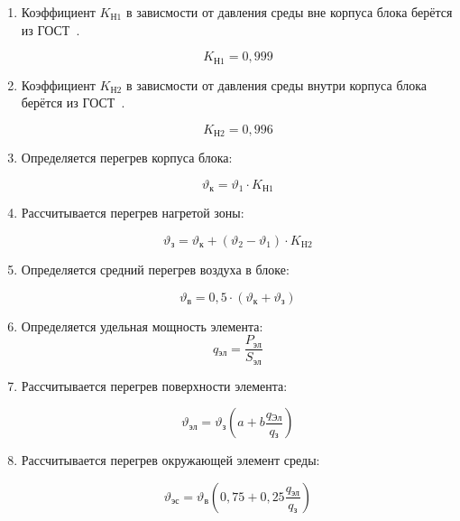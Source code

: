 \begin{enumerate}
\item Коэффициент $K\mathrm{_{Н1}}$ в зависмости от давления
  среды вне корпуса блока берётся из ГОСТ~\cite{GOST-15150-69}.

  $$K\mathrm{_{Н1}} = 0,999$$

  \item Коэффициент $K\mathrm{_{Н2}}$ в зависмости от давления
  среды внутри корпуса блока берётся из ГОСТ~\cite{GOST-15150-69}.

  $$K\mathrm{_{Н2}} = 0,996$$

\item Определяется перегрев корпуса блока:

  \begin{equation}
    \vartheta\mathrm{_к} = \vartheta_1 \cdot K\mathrm{_{Н1}}
  \end{equation}

\item Рассчитывается перегрев нагретой зоны:

  \begin{equation}
    \vartheta\mathrm{_з} = \vartheta\mathrm{_к} + (\vartheta_2 - \vartheta_1) \cdot K\mathrm{_{H2}}
  \end{equation}

\item Определяется средний перегрев воздуха в блоке:

  \begin{equation}
      \vartheta\mathrm{_в} = 0,5 \cdot (\vartheta\mathrm{_к} + \vartheta\mathrm{_з})
    \end{equation}

\item Определяется удельная мощность элемента:
    \begin{equation}
      q\mathrm{_{эл}} = \frac{P\mathrm{_{эл}}}{S\mathrm{_{эл}}}
    \end{equation}

\item Рассчитывается перегрев поверхности элемента:

    \begin{equation}
      \vartheta\mathrm{_{эл}} = \vartheta\mathrm{_{з}} \left(a + b \frac{q\mathrm{_{Эл}}}{q\mathrm{_{з}}}\right)
    \end{equation}

\item Рассчитывается перегрев окружающей элемент среды:

    \begin{equation}
      \vartheta\mathrm{_{эс}} = \vartheta\mathrm{_в}
      \left(0,75 + 0,25\frac{q\mathrm{_{эл}}}{q\mathrm{_{з}}}\right)
    \end{equation}



\end{enumerate}
